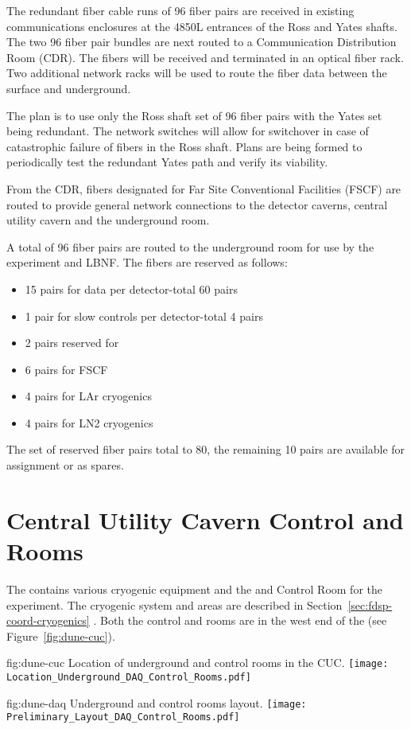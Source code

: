 The redundant fiber cable runs of 96 fiber pairs are received in
existing communications enclosures at the 4850L entrances of the Ross
and Yates shafts.  The two 96 fiber pair bundles are next routed to a
Communication Distribution Room (CDR).  The fibers will be received
and terminated in an optical fiber rack. Two additional network racks
will be used to route the fiber data between the surface and
underground.

The plan is to use only the Ross shaft set of 96 fiber pairs with the
Yates set being redundant.  The network switches will allow for
switchover in case of catastrophic failure of fibers in the Ross
shaft.  Plans are being formed to periodically test the redundant
Yates path and verify its viability.

From the CDR, fibers designated for Far Site Conventional Facilities
(FSCF) are routed to provide general network connections to the
detector caverns, central utility cavern and the underground  room.

A total of 96 fiber pairs are routed to the underground  room for
use by the  experiment and LBNF. The fibers are reserved as
follows:
\begin{itemize}
  \item 15 pairs for  data per detector-total 60 pairs
\item 1 pair for slow controls per detector-total 4 pairs
\item 2 pairs reserved for 
\item 6 pairs for FSCF
\item 4 pairs for LAr cryogenics
  \item 4 pairs for LN2 cryogenics
\end{itemize}

The set of reserved fiber pairs total to 80, the remaining 10 pairs
are available for assignment or as spares.


\section{Central Utility Cavern Control and  Rooms}
\label{sec:fdsp-coord-cuc-daq}

The  contains various cryogenic equipment and the
 and Control Room for the  experiment.  The
cryogenic system and areas are described in
Section~\ref{sec:fdsp-coord-cryogenics} . Both the control and 
rooms are in the west end of the  (see
Figure~\ref{fig:dune-cuc}).
\begin{dunefigure}{fig:dune-cuc}
  {Location of underground  and control rooms in the CUC.}
  \texttt{[image: Location\_Underground\_DAQ\_Control\_Rooms.pdf]}
\end{dunefigure}
\begin{dunefigure}{fig:dune-daq}
  {Underground  and control rooms layout.}
  \texttt{[image: Preliminary\_Layout\_DAQ\_Control\_Rooms.pdf]}
\end{dunefigure}


